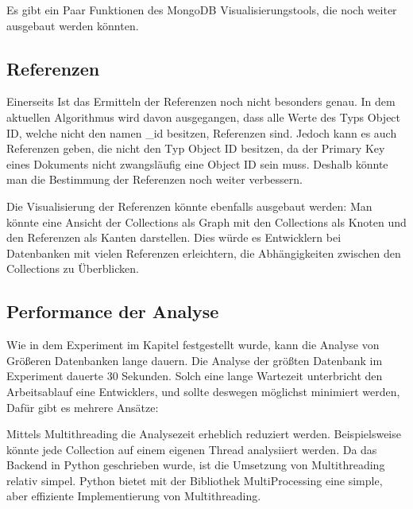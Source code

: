 \iffalse
Im Ausblick werden Ideen für die Weiterentwicklung der erstellten Lösung 
aufgezeigt. Der Ausblick sollte daher zeigen, dass die Ergebnisse der 
Arbeit nicht nur für die in der Arbeit identifizierten Problemstellungen 
verwendbar sind, sondern darüber hinaus erweitert sowie auf andere 
Probleme übertragen werden können.
\fi

Es gibt ein Paar Funktionen des MongoDB Visualisierungstools, die noch weiter ausgebaut werden könnten.

\subsection{Referenzen}
\label{sub:ausblick_referenzen}

Einerseits Ist das Ermitteln der Referenzen noch nicht besonders genau.
In dem aktuellen Algorithmus wird davon ausgegangen, dass alle Werte des Typs Object ID, welche nicht den namen \_id besitzen, Referenzen sind.
Jedoch kann es auch Referenzen geben, die nicht den Typ Object ID besitzen, da der Primary Key eines Dokuments nicht zwangsläufig eine Object ID sein muss.
Deshalb könnte man die Bestimmung der Referenzen noch weiter verbessern.

Die Visualisierung der Referenzen könnte ebenfalls ausgebaut werden:
Man könnte eine Ansicht der Collections als Graph mit den Collections als Knoten und den Referenzen als Kanten darstellen.
Dies würde es Entwicklern bei Datenbanken mit vielen Referenzen erleichtern, die Abhängigkeiten zwischen den Collections zu Überblicken.

\subsection{Performance der Analyse}
\label{sub:ausblick_performance}

Wie in dem Experiment im Kapitel  festgestellt wurde, kann die Analyse von Größeren Datenbanken lange dauern.
Die Analyse der größten Datenbank im Experiment dauerte 30 Sekunden.
Solch eine lange Wartezeit unterbricht den Arbeitsablauf eine Entwicklers, und sollte deswegen möglichst minimiert werden,
Dafür gibt es mehrere Ansätze:

Mittels Multithreading die Analysezeit erheblich reduziert werden.
Beispielsweise könnte jede Collection auf einem eigenen Thread analysiiert werden.
Da das Backend in Python geschrieben wurde, ist die Umsetzung von Multithreading relativ simpel.
Python bietet mit der Bibliothek MultiProcessing eine simple, aber effiziente Implementierung von Multithreading.
~\autocite{python:multiprocessing}


